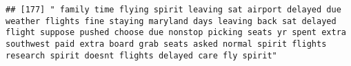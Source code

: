 \documentclass[
]{article}
\begin{document}
\begin{verbatim}
## [177] " family time flying spirit leaving sat airport delayed due weather flights fine staying maryland days leaving back sat delayed flight suppose pushed choose due nonstop picking seats yr spent extra southwest paid extra board grab seats asked normal spirit flights research spirit doesnt flights delayed care fly spirit"                                                                                                                                                                                                                                                                                                                                                                                                                                                                                                                                                                                                                                                                                                                                                                                                                                                                                                                                                                                                                                                                                                                                                                                                                                                                                                                                                                                                                                                                 

\end{verbatim}
\end{document}
